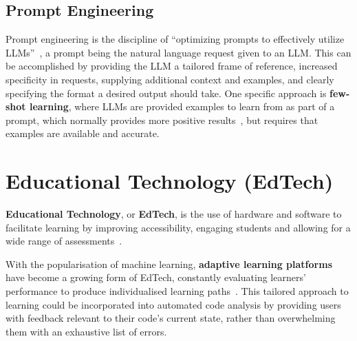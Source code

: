 \subsection{Prompt Engineering}
Prompt engineering is the discipline of ``optimizing prompts to effectively utilize LLMs''~\cite{PromptEngineering}, a prompt being the natural language request given to an LLM. This can be accomplished by providing the LLM a tailored frame of reference, increased specificity in requests, supplying additional context and examples, and clearly specifying the format a desired output should take. One specific approach is \textbf{few-shot learning}, where LLMs are provided examples to learn from as part of a prompt, which normally provides more positive results~\cite{FewShot}, but requires that examples are available and accurate.

\section{Educational Technology (EdTech)}

\textbf{Educational Technology}, or \textbf{EdTech}, is the use of hardware and software to facilitate learning by improving accessibility, engaging students and allowing for a wide range of assessments~\cite{20YearsEdTech}.

With the popularisation of machine learning, \textbf{adaptive learning platforms} have become a growing form of EdTech, constantly evaluating learners' performance to produce individualised learning paths~\cite{AdaptiveLearningPlatforms}. This tailored approach to learning could be incorporated into automated code analysis by providing users with feedback relevant to their code's current state, rather than overwhelming them with an exhaustive list of errors.
